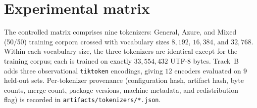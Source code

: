 \section{Experimental matrix}
\label{app:matrix}
The controlled matrix comprises nine tokenizers: General, Azure, and Mixed (50/50)
training corpora crossed with vocabulary sizes $8{,}192$, $16{,}384$, and
$32{,}768$. Within each vocabulary size, the three tokenizers are identical except
for the training corpus; each is trained on exactly $33{,}554{,}432$ UTF-8 bytes.
Track~B adds three observational \texttt{tiktoken} encodings, giving $12$ encoders
evaluated on $9$ held-out sets. Per-tokenizer provenance (configuration hash,
artifact hash, byte counts, merge count, package versions, machine metadata, and
redistribution flag) is recorded in \texttt{artifacts/tokenizers/*.json}.
